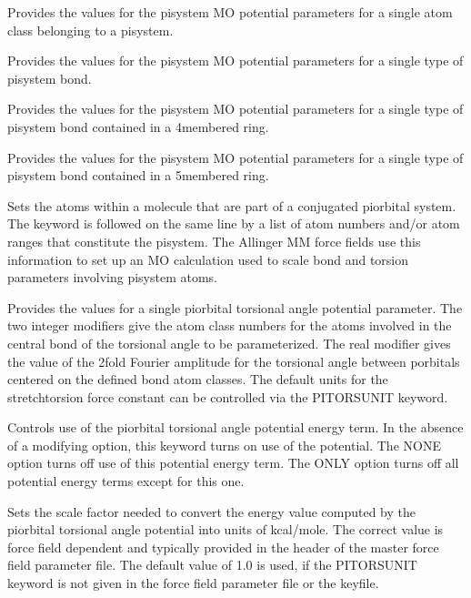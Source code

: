 \documentclass[letterpaper,11pt,english]{sphinxmanual}
\begin{document}
  Provides the values for the pisystem MO potential parameters for a single atom class belonging to a pisystem.

  Provides the values for the pisystem MO potential parameters for a single type of pisystem bond.

  Provides the values for the pisystem MO potential parameters for a single type of pisystem bond contained in a 4\sphinxhyphen{}membered ring.

  Provides the values for the pisystem MO potential parameters for a single type of pisystem bond contained in a 5\sphinxhyphen{}membered ring.

  Sets the atoms within a molecule that are part of a conjugated pi\sphinxhyphen{}orbital system. The keyword is followed on the same line by a list of atom numbers and/or atom ranges that constitute the pi\sphinxhyphen{}system. The Allinger MM force fields use this information to set up an MO calculation used to scale bond and torsion parameters involving pi\sphinxhyphen{}system atoms.

  Provides the values for a single pi\sphinxhyphen{}orbital torsional angle potential parameter. The two integer modifiers give the atom class numbers for the atoms involved in the central bond of the torsional angle to be parameterized. The real modifier gives the value of the 2\sphinxhyphen{}fold Fourier amplitude for the torsional angle between p\sphinxhyphen{}orbitals centered on the defined bond atom classes. The default units for the stretch\sphinxhyphen{}torsion force constant can be controlled via the PITORSUNIT keyword.

  Controls use of the pi\sphinxhyphen{}orbital torsional angle potential energy term. In the absence of a modifying option, this keyword turns on use of the potential. The NONE option turns off use of this potential energy term. The ONLY option turns off all potential energy terms except for this one.

  Sets the scale factor needed to convert the energy value computed by the pi\sphinxhyphen{}orbital torsional angle potential into units of kcal/mole. The correct value is force field dependent and typically provided in the header of the master force field parameter file. The default value of 1.0 is used, if the PITORSUNIT keyword is not given in the force field parameter file or the keyfile.
\end{document}
